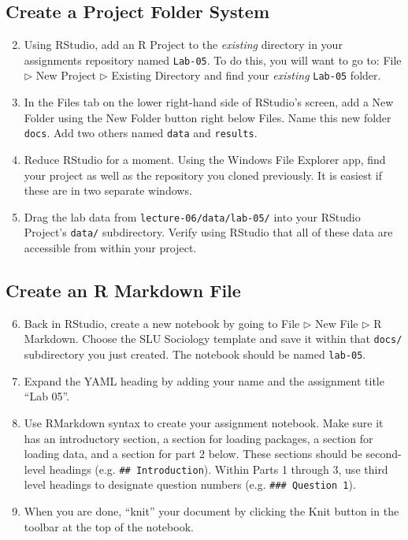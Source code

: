 \documentclass{tufte-handout}
\begin{document}
\subsection{Create a Project Folder System}
\begin{enumerate}[label=\alph*.]
\setcounter{enumi}{1}
\item Using RStudio, add an R Project to the \textit{existing} directory in your assignments repository named \texttt{Lab-05}. To do this, you will want to go to: \textsf{File $\triangleright$} {\color{red}\textsf{New Project}} \textsf{$\triangleright$ Existing Directory} and find your \textit{existing} \texttt{Lab-05} folder.
\item In the \textsf{Files} tab on the lower right-hand side of RStudio's screen, add a New Folder using the \textsf{New Folder} button right below \textsf{Files}. Name this new folder \texttt{docs}. Add two others named \texttt{data} and \texttt{results}.
\item Reduce RStudio for a moment. Using the Windows File Explorer app, find your project as well as the repository you cloned previously. It is easiest if these are in two separate windows.
\item Drag the lab data from \texttt{lecture-06/data/lab-05/} into your RStudio Project's \texttt{data/} subdirectory. Verify using RStudio that all of these data are accessible from within your project.
\end{enumerate}

\vspace{3mm}
\subsection{Create an R Markdown File}
\begin{enumerate}[label=\alph*.]
\setcounter{enumi}{5}
\item Back in RStudio, create a new notebook by going to \textsf{File $\triangleright$ New File $\triangleright$} {\color{red}\textsf{R Markdown}}. Choose the SLU Sociology template and save it within that \texttt{docs/} subdirectory you just created. The notebook should be named \texttt{lab-05}.
\item Expand the YAML heading by adding your name and the assignment title ``Lab 05''.
\item Use RMarkdown syntax to create your assignment notebook. Make sure it has an introductory section, a section for loading packages, a section for loading data, and a section for part 2 below. These sections should be second-level headings (e.g. \texttt{\#\# Introduction}). Within Parts 1 through 3, use third level headings to designate question numbers (e.g. \texttt{\#\#\# Question 1}).
\item When you are done, ``knit'' your document by clicking the \textsf{Knit} button in the toolbar at the top of the notebook.
\end{enumerate}
\end{document}
